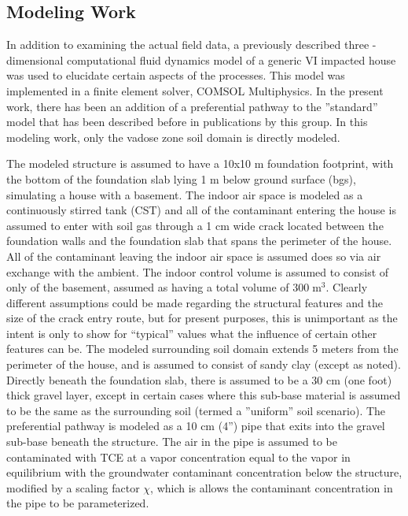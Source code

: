 \documentclass[journal=esthag,manuscript=article]{achemso}
\begin{document}
\subsection{Modeling Work}
In addition to examining the actual field data, a previously described three -dimensional computational fluid dynamics model of a generic VI impacted house was used to elucidate certain aspects of  the processes.
This model was implemented in a finite element solver, COMSOL Multiphysics.
In the present work, there has been an addition of a preferential pathway to the ”standard” model that has been described before in publications by this group\cite{shen_influence_2013,yao_investigating_2017,yao_three-dimensional_2017}.
In this modeling work, only the vadose zone soil domain is directly modeled.

The modeled structure is assumed to have a 10x10 m foundation footprint, with the bottom of the foundation slab lying 1 m below ground surface (bgs), simulating a house with a basement.
The indoor air space is modeled as a continuously stirred tank (CST)\cite{u.s._environmental_protection_agency_oswer_2015} and all of the contaminant entering the house is assumed to enter with soil gas through a 1 cm wide crack located between the foundation walls and the foundation slab that spans the perimeter of the house.
All of the contaminant leaving the indoor air space is assumed does so via air exchange with the ambient.
The indoor control volume is assumed to consist of only of the basement, assumed as having a total volume of $300 \; \mathrm{m^3}$.
Clearly different assumptions could be made regarding the structural features and the size of the crack entry route, but for present purposes, this is unimportant as the intent is only to show for “typical” values what the influence of certain other features can be.
The modeled surrounding soil domain extends 5 meters from the perimeter of the house, and is assumed to consist of sandy clay (except as noted).
Directly beneath the foundation slab, there is assumed to be a 30 cm (one foot) thick gravel layer, except in certain cases where this sub-base material is assumed to be the same as the surrounding soil (termed  a ”uniform” soil scenario).
The preferential pathway is modeled as a 10 cm (4”) pipe that exits into the gravel sub-base beneath the structure.
The air in the pipe is assumed to be contaminated with TCE at a vapor concentration equal to the vapor in equilibrium with the groundwater contaminant concentration below the structure, modified by a scaling factor $\chi$, which is allows the contaminant concentration in the pipe to be parameterized.
\end{document}
